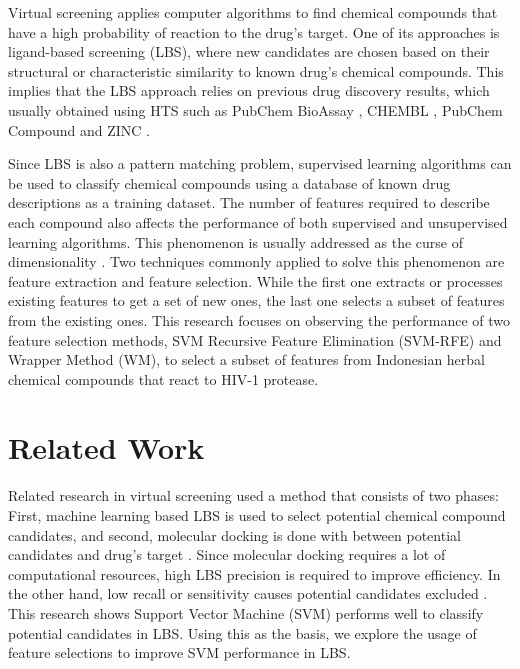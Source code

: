 \documentclass[conference,compsoc,12pt]{IEEEtran}
\begin{document}
	Virtual screening applies computer algorithms to find chemical compounds that have a high probability of reaction to the drug's target. One of its approaches is ligand-based screening (LBS), where new candidates are chosen based on their structural or characteristic similarity to known drug's chemical compounds. This implies that the LBS approach relies on previous drug discovery results, which usually obtained using HTS such as PubChem BioAssay \cite{bioassay2014update}, CHEMBL \cite{bento2014chembl}, PubChem Compound \cite{kim2015pubchem} and ZINC \cite{irwin2012zinc}.
	
	Since LBS is also a pattern matching problem, supervised learning algorithms can be used to classify chemical compounds using a database of known drug descriptions as a training dataset. The number of features required to describe each compound also affects the performance of both supervised and unsupervised learning algorithms. This phenomenon is usually addressed as the curse of dimensionality \cite{janecek2008relationship}. Two techniques commonly applied to solve this phenomenon are feature extraction and feature selection. While the first one extracts or processes existing features to get a set of new ones, the last one selects a subset of features from the existing ones. This research focuses on observing the performance of two feature selection methods, SVM Recursive Feature Elimination (SVM-RFE) and Wrapper Method (WM), to select a subset of features from Indonesian herbal chemical compounds that react to HIV-1 protease.
	
	\section{Related Work}
	
	Related research in virtual screening used a method that consists of two phases: First, machine learning based LBS is used to select potential chemical compound candidates, and second, molecular docking is done with between potential candidates and drug's target \cite{hilman2012analisis}. Since molecular docking requires a lot of computational resources, high LBS precision is required to improve efficiency. In the other hand, low recall or sensitivity causes potential candidates excluded \cite{korkmaz2014drug}. This research shows Support Vector Machine (SVM) performs well to classify potential candidates in LBS. Using this as the basis, we explore the usage of feature selections to improve SVM performance in LBS.
	
\end{document}
